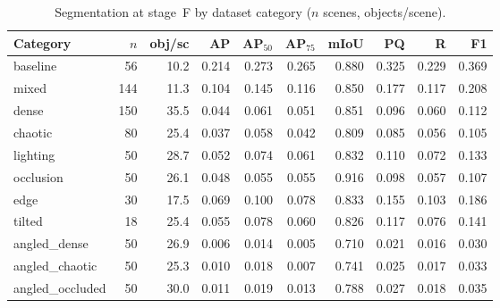 \begin{table}[t]
\centering
\caption{Segmentation at stage~F by dataset category ($n$ scenes, objects/scene).}
\label{tab:exp1-per-category}
\begin{tabular}{lrrrrrrrrr}
\toprule
Category & $n$ & obj/sc & AP & AP$_{50}$ & AP$_{75}$ & mIoU & PQ & R & F1 \\
\midrule
baseline & 56 & 10.2 & 0.214 & 0.273 & 0.265 & 0.880 & 0.325 & 0.229 & 0.369 \\
mixed & 144 & 11.3 & 0.104 & 0.145 & 0.116 & 0.850 & 0.177 & 0.117 & 0.208 \\
dense & 150 & 35.5 & 0.044 & 0.061 & 0.051 & 0.851 & 0.096 & 0.060 & 0.112 \\
chaotic & 80 & 25.4 & 0.037 & 0.058 & 0.042 & 0.809 & 0.085 & 0.056 & 0.105 \\
lighting & 50 & 28.7 & 0.052 & 0.074 & 0.061 & 0.832 & 0.110 & 0.072 & 0.133 \\
occlusion & 50 & 26.1 & 0.048 & 0.055 & 0.055 & 0.916 & 0.098 & 0.057 & 0.107 \\
edge\footnotemark & 30 & 17.5 & 0.069 & 0.100 & 0.078 & 0.833 & 0.155 & 0.103 & 0.186 \\
tilted\footnotemark & 18 & 25.4 & 0.055 & 0.078 & 0.060 & 0.826 & 0.117 & 0.076 & 0.141 \\
angled_dense & 50 & 26.9 & 0.006 & 0.014 & 0.005 & 0.710 & 0.021 & 0.016 & 0.030 \\
angled_chaotic & 50 & 25.3 & 0.010 & 0.018 & 0.007 & 0.741 & 0.025 & 0.017 & 0.033 \\
angled_occluded & 50 & 30.0 & 0.011 & 0.019 & 0.013 & 0.788 & 0.027 & 0.018 & 0.035 \\
\bottomrule
\end{tabular}
\end{table}